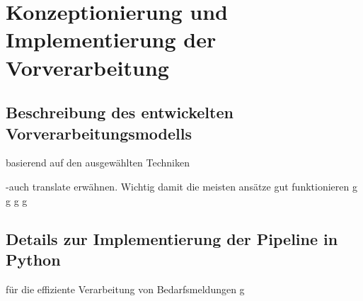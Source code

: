 \chapter{Konzeptionierung und Implementierung der Vorverarbeitung}
\label{chap:implementierung}

\section{Beschreibung des entwickelten Vorverarbeitungsmodells}
basierend auf den ausgewählten Techniken

-auch translate erwähnen. Wichtig damit die meisten ansätze gut funktionieren
\newpage
g
\newpage
g
\newpage
g
\newpage
g
\newpage

\section{Details zur Implementierung der Pipeline in Python}
für die effiziente Verarbeitung von Bedarfsmeldungen
\newpage
g
\newpage
